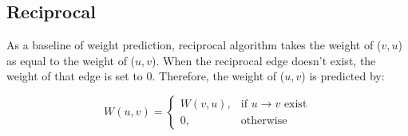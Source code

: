 \subsection{Reciprocal}
As a baseline of weight prediction, reciprocal algorithm takes the 
weight of ($v,u$) as equal to the weight of ($u,v$). When the reciprocal edge 
doesn't exist, the weight of that edge is set to 0. Therefore, the weight of ($u,v$)
is predicted by:

\begin{equation}
W(u,v) =
\begin{cases}
W(v,u),& \text{if $u \rightarrow v$ exist} \\
0,&  \text{otherwise}
\end{cases}
\end{equation}





